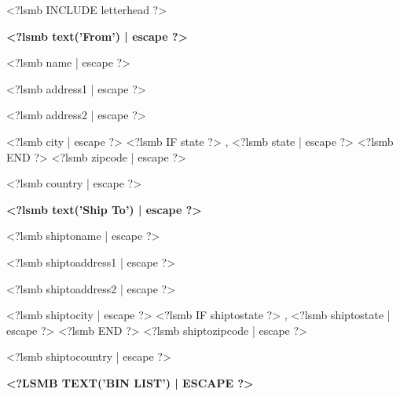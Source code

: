 \documentclass{scrartcl}
\begin{document}
\pagestyle{myheadings}
\thispagestyle{empty}

\fontsize{10pt}{12pt}\selectfont

<?lsmb INCLUDE letterhead ?>


%
%
%


\vspace*{0.5cm}

\parbox[t]{.5\textwidth}{
\textbf{<?lsmb text('From') | escape ?>}
\vspace{0.3cm}

<?lsmb name | escape ?>

<?lsmb address1 | escape ?>

<?lsmb address2 | escape ?>

<?lsmb city | escape ?>
<?lsmb IF state ?>
\hspace{-0.1cm}, <?lsmb state | escape ?>
<?lsmb END ?>
<?lsmb zipcode | escape ?>

<?lsmb country | escape ?>
}
\parbox[t]{.5\textwidth}{
\textbf{<?lsmb text('Ship To') | escape ?>}
\vspace{0.3cm}

<?lsmb shiptoname | escape ?>

<?lsmb shiptoaddress1 | escape ?>

<?lsmb shiptoaddress2 | escape ?>

<?lsmb shiptocity | escape ?>
<?lsmb IF shiptostate ?>
\hspace{-0.1cm}, <?lsmb shiptostate | escape ?>
<?lsmb END ?>
<?lsmb shiptozipcode | escape ?>

<?lsmb shiptocountry | escape ?>
}
\hfill

\vspace{1cm}

\textbf{\MakeUppercase{<?lsmb text('Bin List') | escape ?>}}
\hfill

\vspace{1cm}
\end{document}
